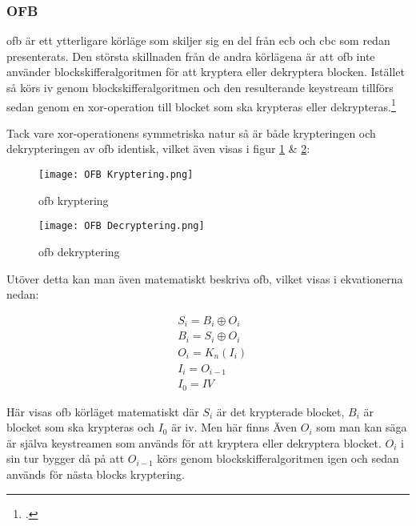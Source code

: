 \subsubsection{OFB}
\label{sec:ofb}
\acrlong{ofb} är ett ytterligare körläge som skiljer sig en del från \acrshort{ecb}
och \acrshort{cbc} som redan presenterats. Den största skillnaden från de andra
körlägena är att \acrshort{ofb} inte använder blockskifferalgoritmen för att kryptera
eller dekryptera blocken. Istället så körs \acrshort{iv} genom blockskifferalgoritmen
och den resulterande \gls{keystream} tillförs sedan genom en \gls{xor}-operation till
blocket som ska krypteras eller dekrypteras.\footcite{dworkin2001sp}

Tack vare \gls{xor}-operationens symmetriska natur så är både krypteringen och
dekrypteringen av \acrshort{ofb} identisk, vilket även visas i figur \ref{fig:ofb-mode-enc}
\& \ref{fig:ofb-mode-dec}:

\begin{figure}[H]
    \texttt{[image: OFB Kryptering.png]}
    \caption{\acrlong{ofb} kryptering}
    \label{fig:ofb-mode-enc}
\end{figure}

\begin{figure}[H]
    \texttt{[image: OFB Decryptering.png]}
    \caption{\acrlong{ofb} dekryptering}
    \label{fig:ofb-mode-dec}
\end{figure}

Utöver detta kan man även matematiskt beskriva \acrshort{ofb}, vilket visas i ekvationerna nedan:

\begin{equation}
    \label{eq:ofb-encryption}
    \begin{aligned}
        &S_i = B_i \oplus O_i\\\nonumber
        &B_i = S_i \oplus O_i\\
        &O_i = K_n(I_i)\\
        &I_i = O_{i-1}\\
        &I_0 = IV
    \end{aligned}
\end{equation}

Här visas \acrshort{ofb} körläget matematiskt där $S_i$ är det krypterade blocket,
$B_i$ är blocket som ska krypteras och $I_0$ är \acrshort{iv}. Men här finns Även
$O_i$ som man kan säga är själva \gls{keystream}en som används för att kryptera eller
dekryptera blocket. $O_i$ i sin tur bygger då på att $O_{i-1}$ körs genom blockskifferalgoritmen
igen och sedan används för nästa blocks kryptering.

